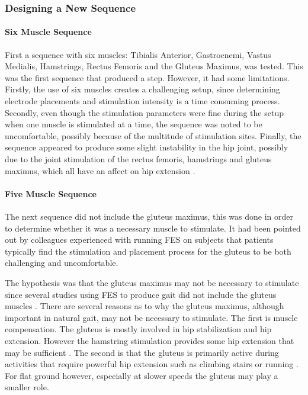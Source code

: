 \subsubsection{Designing a New Sequence}

\paragraph*{Six Muscle Sequence}
First a sequence with six muscles: Tibialis Anterior, Gastrocnemi, Vastus Medialis, Hamstrings, Rectus Femoris and the Gluteus Maximus, was tested. This was the first sequence that produced a step. However, it had some limitations. Firstly, the use of six muscles creates a challenging setup, since determining electrode placements and stimulation intensity is a time consuming process. Secondly, even though the stimulation parameters were fine during the setup when one muscle is stimulated at a time, the sequence was noted to be uncomfortable, possibly because of the multitude of stimulation sites. Finally, the sequence appeared to produce some slight instability in the hip joint, possibly due to the joint stimulation of the rectus femoris, hamstrings and gluteus maximus, which all have an affect on hip extension .

\paragraph*{Five Muscle Sequence}
The next sequence did not include the gluteus maximus, this was done in order to determine whether it was a necessary muscle to stimulate. It had been pointed out by colleagues experienced with running FES on subjects that patients typically find the stimulation and placement process for the gluteus to be both challenging and uncomfortable. 

The hypothesis was that the gluteus maximus may not be necessary to stimulate since several studies using FES to produce gait did not include the gluteus muscles \cite{aout_effects_2023}. There are several reasons as to why the gluteus maximus, although important in natural gait, may not be necessary to stimulate. The first is muscle compensation. The gluteus is mostly involved in hip stabilization and hip extension. However the hamstring stimulation provides some hip extension that may be sufficient \cite{kang_activation_2013}. The second is that the gluteus is primarily active during activities that require powerful hip extension such as climbing stairs or running \cite{noauthor_gluteus_nodate}. For flat ground however, especially at slower speeds the gluteus may play a smaller role.

